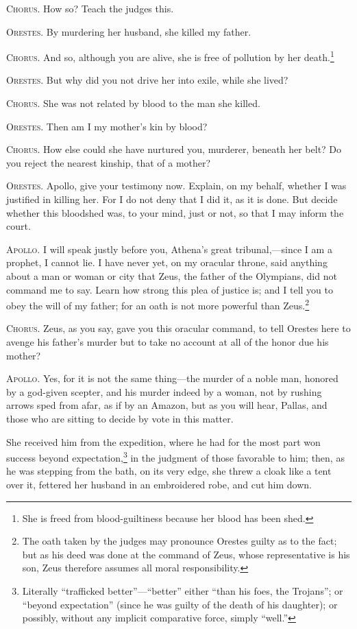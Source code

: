 \documentclass[12pt]{article}
\begin{document}
\textsc{Chorus.} How so? Teach the judges this.

\textsc{Orestes.} By murdering her husband, she killed my father.

\textsc{Chorus.} And so, although you are alive, she is free of pollution by her death.\footnote{She is freed from blood-guiltiness because her blood has been shed.}

\textsc{Orestes.} But why did you not drive her into exile, while she lived?

\textsc{Chorus.} She was not related by blood to the man she killed.

\textsc{Orestes.} Then am I my mother's kin by blood?

\textsc{Chorus.} How else could she have nurtured you, murderer, beneath her belt? Do you reject the nearest kinship, that of a mother?

\textsc{Orestes.} Apollo, give your testimony now. Explain, on my behalf, whether I was justified in killing her. For I do not deny that I did it, as it is done. But decide whether this bloodshed was, to your mind, just or not, so that I may inform the court.

\textsc{Apollo.} I will speak justly before you, Athena's great tribunal,---since I am a prophet, I cannot lie. I have never yet, on my oracular throne, said anything about a man or woman or city that Zeus, the father of the Olympians, did not command me to say. Learn how strong this plea of justice is; and I tell you to obey the will of my father; for an oath is not more powerful than Zeus.\footnote{The oath taken by the judges may pronounce Orestes guilty as to the fact; but as his deed was done at the command of Zeus, whose representative is his son, Zeus therefore assumes all moral responsibility.}

\textsc{Chorus.} Zeus, as you say, gave you this oracular command, to tell Orestes here to avenge his father's murder but to take no account at all of the honor due his mother?

\textsc{Apollo.} Yes, for it is not the same thing---the murder of a noble man, honored by a god-given scepter, and his murder indeed by a woman, not by rushing arrows sped from afar, as if by an Amazon, but as you will hear, Pallas, and those who are sitting to decide by vote in this matter.

She received him from the expedition, where he had for the most part won success beyond expectation,\footnote{Literally ``trafficked better''---``better'' either ``than his foes, the Trojans''; or ``beyond expectation'' (since he was guilty of the death of his daughter); or possibly, without any implicit comparative force, simply ``well.''} in the judgment of those favorable to him; then, as he was stepping from the bath, on its very edge, she threw a cloak like a tent over it, fettered her husband in an embroidered robe, and cut him down.
\end{document}
